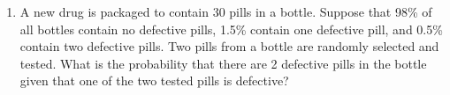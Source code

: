 \documentclass[12pt]{article}
\begin{document}
\begin{enumerate}









\item  \label{Ch5_Bayes_F16Ex1} A new drug is packaged to contain 30 pills in a bottle. Suppose that 98\% of all bottles contain no defective pills, 1.5\% contain one defective pill, and 0.5\% contain two defective pills. Two pills from a bottle are randomly selected and tested. What is the probability that there are 2 defective pills in the bottle given that one of the two tested pills is defective?





\end{enumerate}
\end{document}
